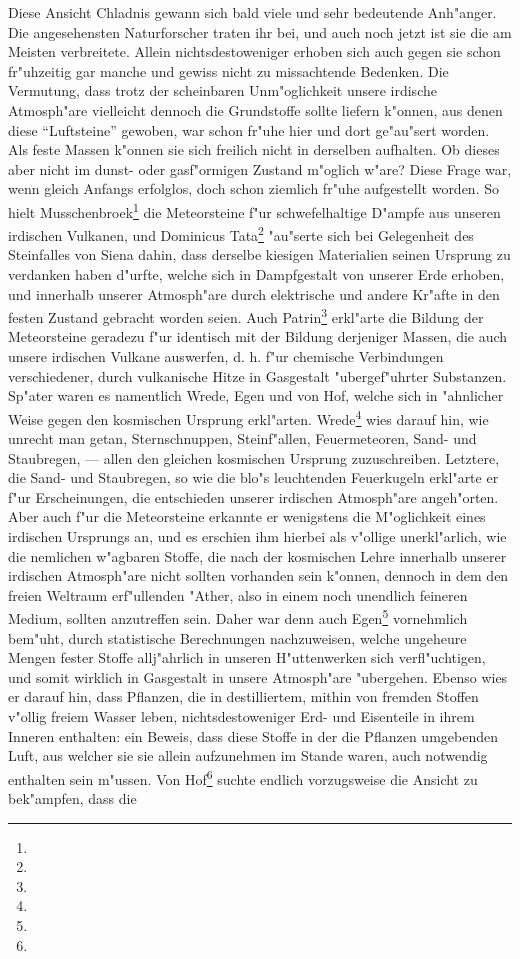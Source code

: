 \documentclass[a4paper, 8pt, oneside, polutonikogreek, german]{article}
\begin{document}
Diese Ansicht Chladnis gewann sich bald viele und sehr bedeutende Anh"anger. Die angesehensten Naturforscher traten ihr bei, und auch noch jetzt ist sie die am Meisten verbreitete. Allein nichtsdestoweniger erhoben sich auch gegen sie schon fr"uhzeitig gar manche und gewiss nicht zu missachtende Bedenken. Die Vermutung, dass trotz der scheinbaren Unm"oglichkeit unsere irdische Atmosph"are vielleicht dennoch die Grundstoffe sollte liefern k"onnen, aus denen diese "`Luftsteine"' gewoben, war schon fr"uhe hier und dort ge"au"sert worden. Als feste Massen k"onnen sie sich freilich nicht in derselben aufhalten. Ob dieses aber nicht im dunst- oder gasf"ormigen Zustand m"oglich w"are? Diese Frage war, wenn gleich Anfangs erfolglos, doch schon ziemlich fr"uhe aufgestellt worden. So hielt Musschenbroek\footnote{} die Meteorsteine f"ur schwefelhaltige D"ampfe aus unseren irdischen Vulkanen, und Dominicus Tata\footnote{} "au"serte sich bei Gelegenheit des Steinfalles von Siena dahin, dass derselbe kiesigen Materialien seinen Ursprung zu verdanken haben d"urfte, welche sich in Dampfgestalt von unserer Erde erhoben, und innerhalb unserer Atmosph"are durch elektrische und andere Kr"afte in den festen Zustand gebracht worden seien. Auch Patrin\footnote{} erkl"arte die Bildung der Meteorsteine geradezu f"ur identisch mit der Bildung derjeniger Massen, die auch unsere irdischen Vulkane auswerfen, d. h. f"ur chemische Verbindungen verschiedener, durch vulkanische Hitze in Gasgestalt "ubergef"uhrter Substanzen. Sp"ater waren es namentlich Wrede, Egen und von Hof, welche sich in "ahnlicher Weise gegen den kosmischen Ursprung erkl"arten. Wrede\footnote{} wies darauf hin, wie unrecht man getan, Sternschnuppen, Steinf"allen, Feuermeteoren, Sand- und Staubregen, --- allen den gleichen kosmischen Ursprung zuzuschreiben. Letztere, die Sand- und Staubregen, so wie die blo"s leuchtenden Feuerkugeln erkl"arte er f"ur Erscheinungen, die entschieden unserer irdischen Atmosph"are angeh"orten. Aber auch f"ur die Meteorsteine erkannte er wenigstens die M"oglichkeit eines irdischen Ursprungs an, und es erschien ihm hierbei als v"ollige unerkl"arlich, wie die nemlichen w"agbaren Stoffe, die nach der kosmischen Lehre innerhalb unserer irdischen Atmosph"are nicht sollten vorhanden sein k"onnen, dennoch in dem den freien Weltraum erf"ullenden "Ather, also in einem noch unendlich feineren Medium, sollten anzutreffen sein. Daher war denn auch Egen\footnote{} vornehmlich bem"uht, durch statistische Berechnungen nachzuweisen, welche ungeheure Mengen fester Stoffe allj"ahrlich in unseren H"uttenwerken sich verfl"uchtigen, und somit wirklich in Gasgestalt in unsere Atmosph"are "ubergehen. Ebenso wies er darauf hin, dass Pflanzen, die in destilliertem, mithin von fremden Stoffen v"ollig freiem Wasser leben, nichtsdestoweniger Erd- und Eisenteile in ihrem Inneren enthalten: ein Beweis, dass diese Stoffe in der die Pflanzen umgebenden Luft, aus welcher sie sie allein aufzunehmen im Stande waren, auch notwendig enthalten sein m"ussen. Von Hof\footnote{} suchte endlich vorzugsweise die Ansicht zu bek"ampfen, dass die 
\end{document}
